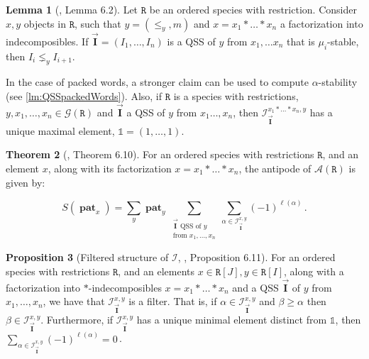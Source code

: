 \documentclass[submission]{FPSAC2023}
\theoremstyle{definition}
\newtheorem{thm}{Theorem}[section]
\newtheorem{prop}[thm]{Proposition}
\newtheorem{lm}[thm]{Lemma}
\newtheorem{smpl}[thm]{Example}
\newcommand{\III}{\vec{\mathbf{I}}}
\DeclareMathOperator{\pat}{\mathbf{pat}}
\begin{document}
\begin{lm}[\cite{PV2022}, Lemma 6.2]\label{obs:pwords-characterisation}
Let $\mathtt{R}$ be an ordered species with restriction.
Consider $x, y$ objects in $\mathtt{R}$, such that $y = (\leq_y, m)$ and $x = x_1\ast \dots \ast x_n$ a factorization into indecomposibles.
If $\III = (I_1, \dots, I_n)$ is a QSS of $y$ from $x_1, \dots x_n$ that is $\mu_i$-stable, then $I_i \lneq_y I_{i+1}$.
\end{lm}

In the case of packed words, a stronger claim can be used to compute $\alpha$-stability (see \cref{lm:QSSpackedWords}). Also, if $\mathtt{R}$ is a species with restrictions, $y, x_1, \dots, x_n \in \mathcal G(\mathtt{R})$ and $\III$ a QSS of $y$ from $x_1\dots, x_n$, then $\mathcal I^{x_1 \ast \dots \ast x_n, y}_{\III}$ has a unique maximal element, $\mathbb{1} = (1, \dots, 1)$.

\begin{thm}[\cite{PV2022}, Theorem 6.10]\label{thm:general_antipode}
For an ordered species with restrictions $\mathtt{R}$, and an element $x$, along with its factorization $x=x_1 \ast \dots \ast x_n$, the antipode of $\mathcal A (\mathtt{R})$ is given by:

$$S(\pat_x) = \sum_y \pat_y \sum_{\substack{\III \text{ QSS of $y$}\\ \text{from }x_1, \dots , x_n}}  \sum_{\alpha \in \mathcal I^{x, y}_{\III}} (-1)^{\ell ( \alpha)} \, .$$
\end{thm}

%

\begin{prop}[Filtered structure of $\mathcal I$, \cite{PV2022}, Proposition 6.11] \label{prop:filter_structure_I}
For an ordered species with restrictions $\mathtt{R}$, and an elements $x\in  \mathtt{R}[J], y\in \mathtt{R}[I]$, along with a factorization into $\ast$-indecomposibles $x = x_1 \ast \dots \ast x_n$ and a QSS $\III$ of $y$ from $x_1, \dots, x_n$, we have that $\mathcal I^{ x, y}_{\III}$ is a filter.
That is, if $\alpha \in \mathcal I^{ x, y}_{\III}$ and $\beta \geq \alpha$ then $\beta \in \mathcal I^{ x, y}_{\III}$. Furthermore, if $\mathcal I^{ x, y}_{\III}$ has a unique minimal element distinct from $\mathbb{1}$, then $\sum_{\alpha \in \mathcal I^{x, y}_{\III}} (-1)^{\ell(\alpha)} = 0 \, $.
\end{prop}
\end{document}
